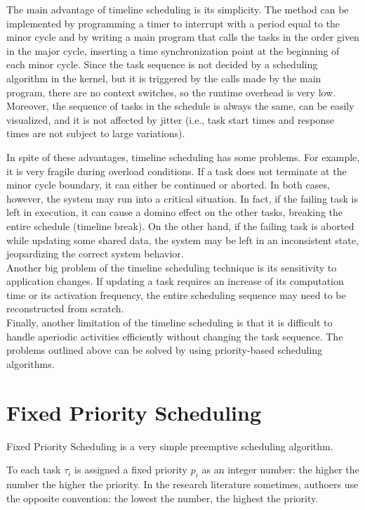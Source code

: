 The main advantage of timeline scheduling is its simplicity. The method can be implemented by programming a timer to interrupt with a period equal to the minor cycle and by writing a main program that calls the tasks in the order given in the major cycle, inserting a time synchronization point at the beginning of each minor cycle. Since the task sequence is not decided by a scheduling algorithm in the kernel, but it is triggered by the calls made by the main program, there are no context switches, so the runtime overhead is very low. Moreover, the sequence of tasks in the schedule is always the same, can be easily visualized, and it is not affected by jitter (i.e., task start times and response times are not subject to large variations).

In spite of these advantages, timeline scheduling has some problems. For example, it is very fragile during overload conditions. If a task does not terminate at the minor cycle boundary, it can either be continued or aborted. In both cases, however, the system may run into a critical situation. In fact, if the failing task is left in execution, it can cause a domino effect on the other tasks, breaking the entire schedule (timeline break). On the other hand, if the failing task is aborted while updating some shared data, the system may be left in an inconsistent state, jeopardizing the correct system behavior.\\
Another big problem of the timeline scheduling technique is its sensitivity to application changes. If updating a task requires an increase of its computation time or its activation frequency, the entire scheduling sequence may need to be reconstructed from scratch.\\
Finally, another limitation of the timeline scheduling is that it is difficult to handle aperiodic activities efficiently without changing the task sequence. The problems outlined above can be solved by using priority-based scheduling algorithms.

\section{Fixed Priority Scheduling}
Fixed Priority Scheduling is a very simple preemptive scheduling algorithm.

To each task $\tau_i$ is assigned a fixed priority $p_i$ as an integer number: the higher the number the higher the priority. In the research literature sometimes, authoers use the opposite convention: the lowest the number, the highest the priority.

